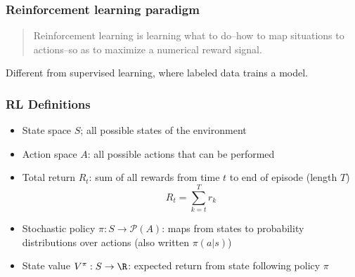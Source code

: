 \documentclass{beamer}
\begin{document}
\begin{frame}
\frametitle{Reinforcement learning paradigm}

\begin{quote}
    Reinforcement learning is learning what to do--how to map situations to actions--so as to maximize a numerical reward signal. \cite{sutton2018reinforcement}
\end{quote}

\begin{figure}
    \centering
    \label{fig:RL}
\end{figure}

Different from supervised learning, where labeled data trains a model.


\end{frame}

\begin{frame}
\frametitle{RL Definitions}

\begin{itemize}
    \item State space $S$; all possible states of the environment
    \item Action space $A$: all possible actions that can be performed
    \item Total return $R_t$: sum of all rewards from time $t$ to end of episode (length $T$)
    \begin{equation}\label{eq:return}
        R_t = \sum_{k=t}^T r_k
    \end{equation}
    \pause
    \item Stochastic policy $\pi: S \to \mathcal{P}(A)$:
        maps from states to probability distributions over actions (also written $\pi(a|s)$)
    \item State value $V^\pi:S \to \R$: expected return from state following policy $\pi$
\end{itemize}

\end{frame}
\end{document}
